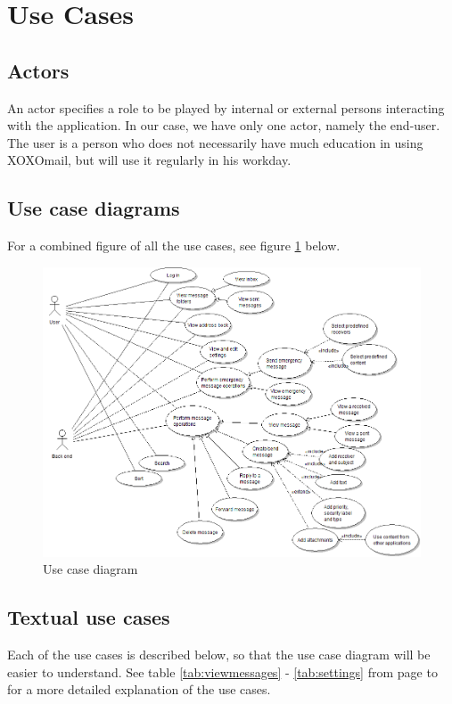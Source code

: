 \section{Use Cases}


\subsection{Actors}
An actor specifies a role to be played by internal or external persons interacting with the application. In our case, we have only one actor, namely the end-user. The user is a person who does not necessarily have much education in using XOXOmail, but will use it regularly in his workday. 

\subsection{Use case diagrams}
For a combined figure of all the use cases, see figure \ref{fig:usecase} below.

\begin{figure}[h!]
\begin{center}
\includegraphics[width=\textwidth]{kpro-use-case}
\caption{Use case diagram} \label{fig:usecase}
\end{center}
\end{figure}

\subsection{Textual use cases}
Each of the use cases is described below, so that the use case diagram will be easier to understand. See table \ref{tab:viewmessages} - \ref{tab:settings} from page \pageref{tab:viewmessages} to \pageref{tab:settings} for a more detailed explanation of the use cases.

